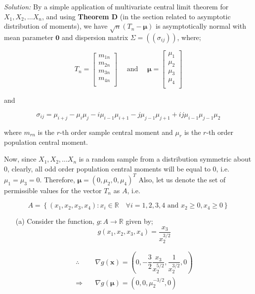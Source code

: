 \documentclass[12pt]{article}
\newcommand{\R}{\mathbb{R}}
\theoremstyle{definition}
\newenvironment{answer}{\textit{Solution: }\quad }{ \hfill \qedsymbol}
\begin{document}
\begin{answer}
	By a simple application of multivariate central limit theorem for $X_1, X_2, \dots X_n$, and using \textbf{Theorem D} (in the section related to asymptotic distribution of moments), we have $\sqrt{n} (T_n - \bm{\mu})$ is asymptotically normal with mean parameter $\bm{0}$ and dispersion matrix $\Sigma = ((\sigma_{ij}))$, where;

	$$T_n = \begin{bmatrix}
		m_{1n}\\
		m_{2n}\\
		m_{3n}\\
		m_{4n}\\
	\end{bmatrix} \quad \text{ and } \quad 
	\bm{\mu} = \begin{bmatrix}
		\mu_1\\
		\mu_2\\
		\mu_3\\
		\mu_4\\
	\end{bmatrix}
	$$

	and 
	
	$$
	\sigma_{ij} = \mu_{i+j} - \mu_i \mu_j - i\mu_{i-1}\mu_{i+1} - j\mu_{j-1}\mu_{j+1} + ij \mu_{i-1}\mu_{j-1}\mu_2
	$$


	where $m_{rn}$ is the $r$-th order sample central moment and $\mu_r$ is the $r$-th order population central moment.

	Now, since $X_1, X_2, \dots X_n$ is a random sample from a distribution symmetric about $0$, clearly, all odd order population central moments will be equal to $0$, i.e. $\mu_1 = \mu_3 = 0$. Therefore, $\bm{\mu} = (0, \mu_2, 0, \mu_4)^T$
	Also, let us denote the set of permissible values for the vector $T_n$ as $A$, i.e.

	$$A = \left\{ (x_1,x_2,x_3, x_4) : x_i \in \R \quad \forall i = 1, 2, 3, 4 \text{ and } x_2 \geq 0, x_4 \geq 0 \right\}$$

	\begin{enumerate}
		\item[(a)]  Consider the function, $g : A \rightarrow \R$ given by;
		$$g(x_1, x_2, x_3, x_4) = \dfrac{x_3}{x_2^{3/2}}$$
		
		\begin{align*}
			\therefore \quad 
			& \nabla g(\bm{x}) = \left( 0, -\dfrac{3}{2} \dfrac{x_3}{x_2^{5/2}}, \dfrac{1}{x_2^{3/2}}, 0 \right)\\
			\Rightarrow \quad & \nabla g(\bm{\mu}) = \left( 0, 0, \mu_2^{-3/2}, 0 \right)
		\end{align*}


\end{enumerate}
\end{answer}
\end{document}
